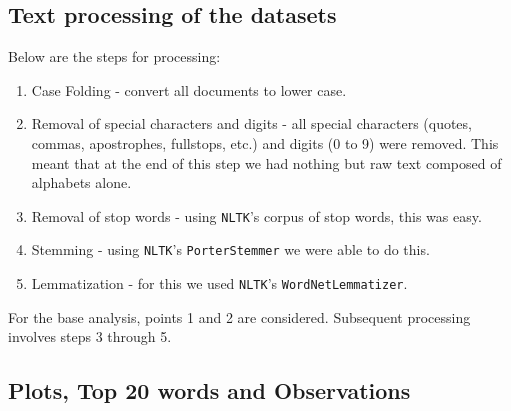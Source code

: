 \documentclass{article}
\begin{document}
\subsection{Text processing of the datasets}
\begin{flushleft}
Below are the steps for processing:
\begin{enumerate}
\item Case Folding - convert all documents to lower case.
\item Removal of special characters and digits - all special characters (quotes, commas, apostrophes, fullstops, etc.) and digits (0 to 9) were removed. This meant that at the end of this step we had nothing but raw text composed of alphabets alone.
\item Removal of stop words - using \texttt{NLTK}'s corpus of stop words, this was easy.
\item Stemming - using \texttt{NLTK}'s \texttt{PorterStemmer} we were able to do this.
\item Lemmatization - for this we used \texttt{NLTK}'s \texttt{WordNetLemmatizer}.
\end{enumerate}

For the base analysis, points 1 and 2 are considered. Subsequent processing involves steps 3 through 5.
\end{flushleft}
\newpage

\subsection{Plots, Top 20 words and Observations}
\end{document}
